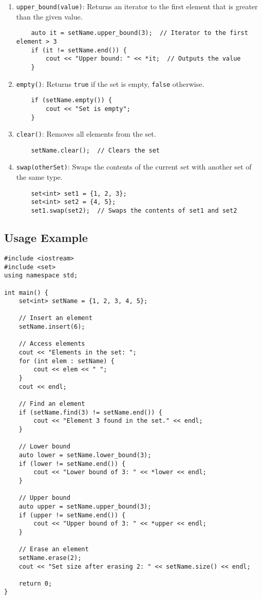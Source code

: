 \documentclass{article}
\begin{document}
\begin{enumerate}
    \item \texttt{upper\_bound(value)}: Returns an iterator to the first element that is greater than the given value.
    \begin{lstlisting}
    auto it = setName.upper_bound(3);  // Iterator to the first element > 3
    if (it != setName.end()) {
        cout << "Upper bound: " << *it;  // Outputs the value
    }
    \end{lstlisting}

    \item \texttt{empty()}: Returns \texttt{true} if the set is empty, \texttt{false} otherwise.
    \begin{lstlisting}
    if (setName.empty()) {
        cout << "Set is empty";
    }
    \end{lstlisting}

    \item \texttt{clear()}: Removes all elements from the set.
    \begin{lstlisting}
    setName.clear();  // Clears the set
    \end{lstlisting}

    \item \texttt{swap(otherSet)}: Swaps the contents of the current set with another set of the same type.
    \begin{lstlisting}
    set<int> set1 = {1, 2, 3};
    set<int> set2 = {4, 5};
    set1.swap(set2);  // Swaps the contents of set1 and set2
    \end{lstlisting}
\end{enumerate}

\subsection{Usage Example}

\begin{lstlisting}
#include <iostream>
#include <set>
using namespace std;

int main() {
    set<int> setName = {1, 2, 3, 4, 5};
    
    // Insert an element
    setName.insert(6);
    
    // Access elements
    cout << "Elements in the set: ";
    for (int elem : setName) {
        cout << elem << " ";
    }
    cout << endl;

    // Find an element
    if (setName.find(3) != setName.end()) {
        cout << "Element 3 found in the set." << endl;
    }

    // Lower bound
    auto lower = setName.lower_bound(3);
    if (lower != setName.end()) {
        cout << "Lower bound of 3: " << *lower << endl;
    }

    // Upper bound
    auto upper = setName.upper_bound(3);
    if (upper != setName.end()) {
        cout << "Upper bound of 3: " << *upper << endl;
    }

    // Erase an element
    setName.erase(2);
    cout << "Set size after erasing 2: " << setName.size() << endl;

    return 0;
}
\end{lstlisting}
\end{document}
